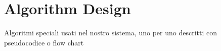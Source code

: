 \documentclass[../../dd.tex]{subfiles}
\begin{document}
	\chapter{Algorithm Design}
		Algoritmi speciali usati nel nostro sistema, uno per uno descritti con pseudocodice o flow chart
\end{document}
